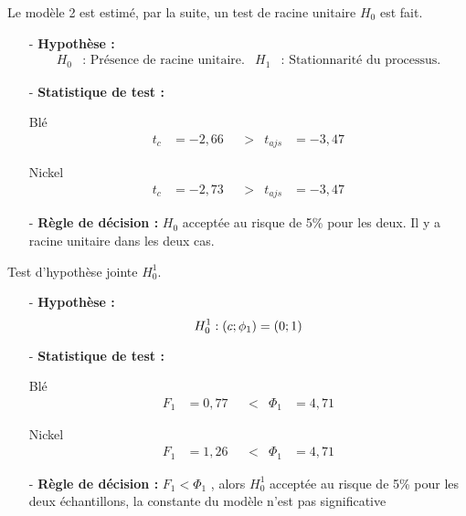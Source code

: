     Le modèle 2 est estimé, par la suite, un test de racine unitaire $H_{0}$ est fait.
    \begin{itemize}
    \item[-]\textbf{Hypothèse :} 
    \begin{align*}
        H_{0} &: \text{ Présence de racine unitaire.} & H_{1} &: \text{ Stationnarité du processus.}
    \end{align*}
    \item[-]\textbf{Statistique de test :} 
    \begin{multicols}{2}
    \centering Blé
    \begin{align*}
            t_{c} &= -2,66 & &> & t_{ajs} &= -3,47
    \end{align*}

    \columnbreak

    \centering Nickel
    \begin{align*}
        t_{c} &= -2,73 & &> & t_{ajs} &= -3,47
    \end{align*}
    \end{multicols}
    \item[-]\textbf{Règle de décision :} $H_{0}$ acceptée au risque de 5\% pour les deux. Il y a racine unitaire dans les deux cas.
    \end{itemize}
    Test d'hypothèse jointe $H_{0}^{1}$.
    \begin{itemize}
    \item[-]\textbf{Hypothèse :} 
    \begin{equation*}
            H_{0}^{1} : (c; \phi_{1}) = (0;1)\\
    \end{equation*}
    \item[-]\textbf{Statistique de test :}
    \begin{multicols}{2}
        \centering Blé
        \begin{align*}
            F_{1} &= 0,77 & &< & \Phi_{1} &= 4,71
        \end{align*}
    
        \columnbreak
    
        \centering Nickel
        \begin{align*}
            F_{1} &= 1,26 & &< & \Phi_{1} &= 4,71
        \end{align*}
    \end{multicols}  
    \item[-]\textbf{Règle de décision :}  $F_{1} < \Phi_{1}$ , alors $H_{0}^{1}$ acceptée au risque de 5\% pour les deux échantillons, la constante du modèle n'est pas
    significative
    \end{itemize}
